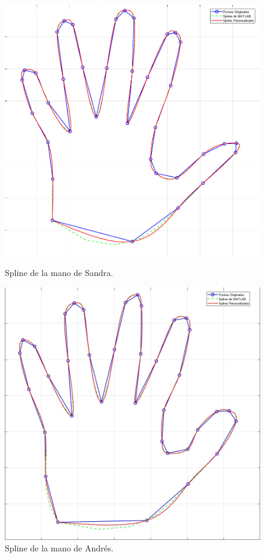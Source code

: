 \begin{homeworkProblem}
\begin{solucion}
\begin{figure}[H]
    \centering
    \begin{minipage}{0.48\textwidth}
        \centering
        \includegraphics[width=\textwidth]{Figures/mano final.png} %
        \caption{Spline de la mano de Sandra.}
        \label{fig:spline_sandra}
    \end{minipage}
    \hfill
    \begin{minipage}{0.48\textwidth}
        \centering
        \includegraphics[width=\textwidth]{Figures/mano Andres.jpg} %
        \caption{Spline de la mano de Andrés.}
        \label{fig:spline_andres}
    \end{minipage}
\end{figure}


\end{solucion}
\end{homeworkProblem}
